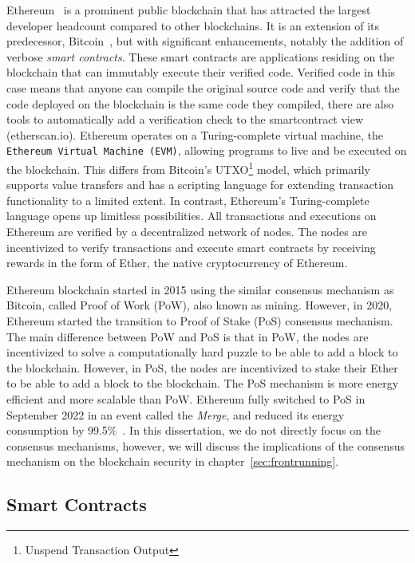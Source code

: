 Ethereum~\cite{wood2014ethereum} is a prominent public blockchain that has attracted the largest developer headcount compared to other blockchains. It is an extension of its predecessor, Bitcoin~\cite{nakamoto2008bitcoin}, but with significant enhancements, notably the addition of verbose \textit{smart contracts}. These smart contracts are applications residing on the blockchain that can immutably execute their verified code. Verified code in this case means that anyone can compile the original source code and verify that the code deployed on the blockchain is the same code they compiled, there are also tools to automatically add a verification check to the smartcontract view (\eg etherscan.io). Ethereum operates on a Turing-complete virtual machine, the \texttt{Ethereum Virtual Machine (EVM)}, allowing programs to live and be executed on the blockchain. This differs from Bitcoin's UTXO\footnote{Unspend Transaction Output} model, which primarily supports value transfers and has a scripting language for extending transaction functionality to a limited extent. In contrast, Ethereum's Turing-complete language opens up limitless possibilities.  All transactions and executions on Ethereum are verified by a decentralized network of nodes. The nodes are incentivized to verify transactions and execute smart contracts by receiving rewards in the form of Ether, the native cryptocurrency of Ethereum. 

Ethereum blockchain started in 2015 using the similar consensus mechanism as Bitcoin, called Proof of Work (PoW), also known as mining. However, in 2020, Ethereum started the transition to Proof of Stake (PoS) consensus mechanism. The main difference between PoW and PoS is that in PoW, the nodes are incentivized to solve a computationally hard puzzle to be able to add a block to the blockchain. However, in PoS, the nodes are incentivized to stake their Ether to be able to add a block to the blockchain. The PoS mechanism is more energy efficient and more scalable than PoW. Ethereum fully switched to PoS in September 2022 in an event called the \textit{Merge}, and reduced its energy consumption by 99.5\%~\cite{themerge}. In this dissertation, we do not directly focus on the consensus mechanisms, however, we will discuss the implications of the consensus mechanism on the blockchain security in chapter~\ref{sec:frontrunning}. 


\subsection{Smart Contracts}

